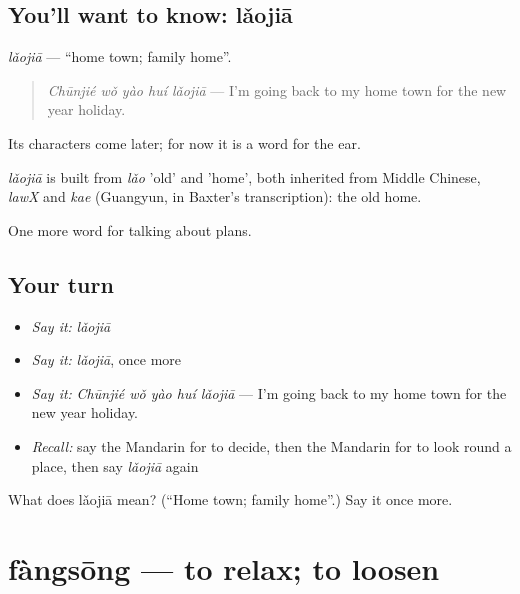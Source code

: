 \subsection*{You'll want to know: lǎojiā}
\emph{lǎojiā} — \textquotedblleft{}home town; family home\textquotedblright{}.

\begin{quote}
\emph{Chūnjié wǒ yào huí lǎojiā} — I'm going back to my home town for the new year holiday.
\end{quote}

Its characters come later; for now it is a word for the ear.

\begin{cousinweb}
\emph{lǎojiā} is built from \emph{lǎo} 'old' and  'home', both inherited from Middle Chinese, \emph{lawX} and \emph{kae} (Guangyun, in Baxter's transcription): the old home.
\end{cousinweb}

\begin{grammarlens}[title={What you've built}]
One more word for talking about plans.
\end{grammarlens}

\subsection*{Your turn}
\begin{itemize}
\raggedright
  \item \emph{Say it:} \emph{lǎojiā}
  \item \emph{Say it:} \emph{lǎojiā}, once more
  \item \emph{Say it:} \emph{Chūnjié wǒ yào huí lǎojiā} — I'm going back to my home town for the new year holiday.
  \item \emph{Recall:} say the Mandarin for to decide, then the Mandarin for to look round a place, then say \emph{lǎojiā} again
\end{itemize}

\begin{tcolorbox}[breakable,colback=teal!4,colframe=teal!35!black,title={Before you move on}]
What does lǎojiā mean? (\textquotedblleft{}Home town; family home\textquotedblright{}.) Say it once more.
\end{tcolorbox}
\section[fàngsōng]{fàngsōng — to relax; to loosen}

